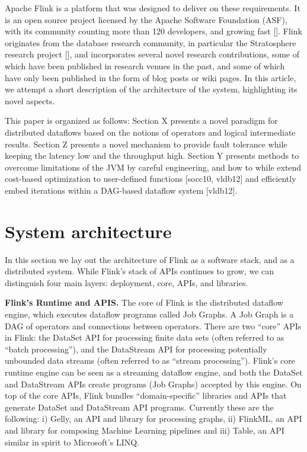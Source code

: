 \documentclass{sig-alternate}
\begin{document}
Apache Flink is a platform that was designed to deliver on these requirements. It is an open source project licensed by the Apache Software Foundation (ASF), with its community counting more than 120 developers, and growing fast []. Flink originates from the database research community, in particular the Stratosphere research project [], and incorporates several novel research contributions, some of which have been published in research venues in the past, and some of which have only been published in the form of blog posts or wiki pages. In this article, we attempt a short description of the architecture of the system, highlighting its novel aspects.

This paper is organized as follows: Section X presents a novel paradigm for distributed dataflows based on the notions of operators and logical intermediate results. Section Z presents a novel mechanism to provide fault tolerance while keeping the latency low and the throughput high. Section Y presents methods to overcome limitations of the JVM by careful engineering, and how to while extend cost-based optimization to user-defined functions [socc10, vldb12] and efficiently embed iterations within a DAG-based dataflow system [vldb12]. 


\section{System architecture}

In this section we lay out the architecture of Flink as a software stack, and as a distributed system. While Flink's stack of APIs continues to grow, we can distinguish four main layers: deployment, core, APIs, and libraries.


\textbf{Flink's Runtime and APIS.} The core of Flink is the distributed dataflow engine, which executes dataflow programs called Job Graphs. A Job Graph is a DAG of operators and connections between operators. There are two ``core'' APIs in Flink: the DataSet API for processing finite data sets (often referred to as ``batch processing''), and the DataStream API for processing potentially unbounded data streams (often referred to as ``stream processing''). Flink's core runtime engine can be seen as a streaming dataflow engine, and both the DataSet and DataStream APIs create programs (Job Graphs) accepted by this engine. On top of the core APIs, Flink bundles ``domain-specific'' libraries and APIs that generate DataSet and DataStream API programs. Currently these are the following: i) Gelly, an API and library for processing graphs, ii) FlinkML, an API and library for composing Machine Learning pipelines and iii) Table, an API similar in spirit to Microsoft's LINQ.
\end{document}
